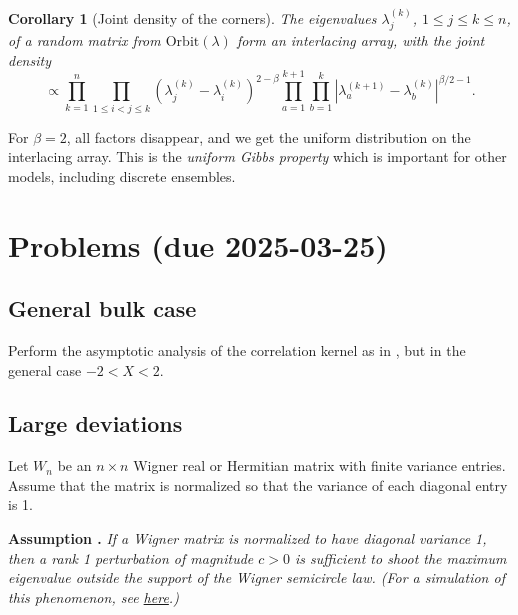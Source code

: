 \documentclass[letterpaper,11pt,oneside,reqno]{article}
\numberwithin{equation}{section}
\newtheorem{corollary}[proposition]{Corollary}
\theoremstyle{definition}
\begin{document}
\begin{corollary}[Joint density of the corners]
	\label{cor:corners_density}
	The eigenvalues $\lambda^(k)_j$, $1\le j\le k\le n$,
	of a random matrix from $\mathrm{Orbit}(\lambda)$
	form an interlacing array, with the joint density
	\begin{equation*}
		\propto
		\prod_{k=1}^n
		\prod_{1\le i<j\le k}\left(\lambda_j^{(k)}-\lambda_i^{(k)}\right)^{2-\beta}
		\prod_{a=1}^{k+1}\prod_{b=1}^k
		\left|\lambda_a^{(k+1)}-\lambda_b^{(k)}\right|^{\beta/2-1}.
	\end{equation*}
\end{corollary}
For $\beta=2$, all factors disappear, and we get the
uniform distribution on the interlacing array. This is the \emph{uniform Gibbs property}
which is important for other models, including discrete ensembles.


\appendix
\setcounter{section}{6}

\section{Problems (due 2025-03-25)}

\subsection{General bulk case}
\label{prob:imaginary-critical-points}

Perform the asymptotic analysis of the correlation
kernel as in ,
but in the general case $-2<X<2$.


\subsection{Large deviations}
\label{prob:large-deviation}

Let \(W_n\) be an \(n\times n\) Wigner real or Hermitian matrix with finite variance entries. Assume that the matrix is normalized so that the variance of each diagonal entry is 1.

\medskip

\textbf{Assumption \cite{BBP2005phase}.} \textit{If a Wigner matrix is normalized to have diagonal variance 1, then a rank 1 perturbation of magnitude $c>0$ is sufficient to shoot the maximum eigenvalue outside the support of the Wigner semicircle law. (For a simulation of this phenomenon, see \href{https://lpetrov.cc/simulations/2025-01-28-bbp-transition/}{here}.)}

\medskip
\end{document}
